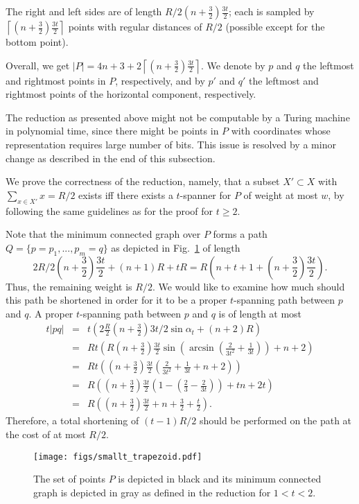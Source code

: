 \documentclass[a4paper]{llncs}
\begin{document}
The right and left sides are of length $R/2(n+\frac{3}{2})\frac{3t}{2}$;
each is sampled by $\left\lceil (n+\frac{3}{2})\frac{3t}{2}\right\rceil$
points with regular distances of $R/2$ (possible except for the bottom point).

Overall, we get $|P|=4n+3+2\left\lceil (n+\frac{3}{2})\frac{3t}{2}\right\rceil$.
We denote by $p$ and $q$ the leftmost and rightmost points in $P$, respectively,
and by $p'$ and $q'$ the leftmost and rightmost points of the horizontal component, respectively.

The reduction as presented above might not be computable by a Turing machine in polynomial time,
since there might be points in $P$ with coordinates whose representation requires large number of bits.
This issue is resolved by a minor change as described in the end of this subsection.

We prove the correctness of the reduction, namely, 
that a subset $X'\subset X$ with $\sum_{x \in X'} x =R/2$ exists 
iff there exists a $t$-spanner for $P$ of weight at most $w$,
by following the same guidelines as for the proof for $t \geq 2$.

Note that the minimum connected graph over $P$ forms a path
$Q=\{p=p_1,...,p_m=q\}$ as depicted in Fig.~\ref{fig:smallt}
of length 
$$2R/2(n+\frac{3}{2})\frac{3t}{2} + (n+1)R + tR =R(n+t+1+(n+\frac{3}{2})\frac{3t}{2}).$$
Thus, the remaining weight is $R/2$.
We would like to examine how much should this path be shortened 
in order for it to be a proper $t$-spanning path between $p$ and $q$.
A proper $t$-spanning path between $p$ and $q$ is of length at most 
\begin{eqnarray*}
t|pq| &=& t(2\frac{R}{2}(n+\frac{3}{2})3t/2\sin\alpha_t + (n+2)R)\\
			&=& Rt(R(n+\frac{3}{2})\frac{3t}{2}\sin(\arcsin(\frac{2}{3t^2}+\frac{1}{3t}))+ n + 2)\\
			&=& Rt((n+\frac{3}{2})\frac{3t}{2}(\frac{2}{3t^2}+\frac{1}{3t}+ n + 2))\\
			&=& R((n+\frac{3}{2})\frac{3t}{2}(1-(\frac{2}{3}-\frac{2}{3t}))+ tn + 2t)\\
			&=& R((n+\frac{3}{2})\frac{3t}{2} + n + \frac{3}{2} + \frac{t}{2}).
\end{eqnarray*}
Therefore, a total shortening of $(t-1)R/2$ should be performed on the path
at the cost of at most $R/2$.
\begin{figure}[htb]
    \centering
        \texttt{[image: figs/smallt\_trapezoid.pdf]}
    \caption{The set of points $P$ is depicted in black 
    and its minimum connected graph is depicted in gray as defined in the reduction for $1<t<2$.}
    \label{fig:smallt}
\end{figure}
\end{document}
